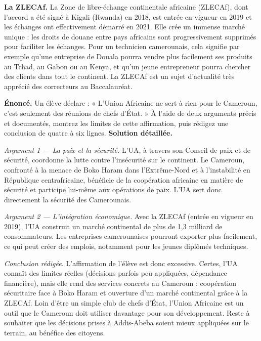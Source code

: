 \documentclass[11pt]{article}
\newcommand{\cle}[1]{{\popxbold\color{popdark}#1}}
\begin{document}
\textbf{La ZLECAf.} La \cle{Zone de libre-échange continentale africaine} (ZLECAf), dont l'accord a été signé à Kigali (Rwanda) en 2018, est entrée en vigueur en 2019 et les échanges ont effectivement démarré en 2021. Elle crée un immense marché unique : les droits de douane entre pays africains sont progressivement supprimés pour faciliter les échanges. Pour un technicien camerounais, cela signifie par exemple qu'une entreprise de Douala pourra vendre plus facilement ses produits au Tchad, au Gabon ou au Kenya, et qu'un jeune entrepreneur pourra chercher des clients dans tout le continent. La ZLECAf est un sujet d'actualité très apprécié des correcteurs au Baccalauréat.

\begin{exoresolu}
\textbf{Énoncé.} Un élève déclare : « L'Union Africaine ne sert à rien pour le Cameroun, c'est seulement des réunions de chefs d'État. » À l'aide de deux arguments précis et documentés, montrez les limites de cette affirmation, puis rédigez une conclusion de quatre à six lignes.
\tcblower
\textbf{Solution détaillée.}

\emph{Argument 1 — La paix et la sécurité.} L'UA, à travers son Conseil de paix et de sécurité, coordonne la lutte contre l'insécurité sur le continent. Le Cameroun, confronté à la menace de Boko Haram dans l'Extrême-Nord et à l'instabilité en République centrafricaine, bénéficie de la coopération africaine en matière de sécurité et participe lui-même aux opérations de paix. L'UA sert donc directement la sécurité des Camerounais.

\emph{Argument 2 — L'intégration économique.} Avec la ZLECAf (entrée en vigueur en 2019), l'UA construit un marché continental de plus de 1,3 milliard de consommateurs. Les entreprises camerounaises pourront exporter plus facilement, ce qui peut créer des emplois, notamment pour les jeunes diplômés techniques.

\emph{Conclusion rédigée.} L'affirmation de l'élève est donc excessive. Certes, l'UA connaît des limites réelles (décisions parfois peu appliquées, dépendance financière), mais elle rend des services concrets au Cameroun : coopération sécuritaire face à Boko Haram et ouverture d'un marché continental grâce à la ZLECAf. Loin d'être un simple club de chefs d'État, l'Union Africaine est un outil que le Cameroun doit utiliser davantage pour son développement. Reste à souhaiter que les décisions prises à Addis-Abeba soient mieux appliquées sur le terrain, au bénéfice des citoyens.
\end{exoresolu}
\end{document}
